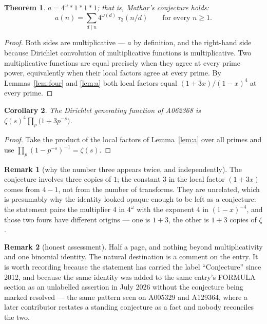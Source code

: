 \documentclass[11pt,a4paper]{article}
\theoremstyle{plain}
\newtheorem{theorem}{Theorem}
\newtheorem{corollary}[theorem]{Corollary}
\theoremstyle{definition}
\newtheorem*{remark}{Remark}
\begin{document}
\begin{theorem}\label{thm:main}
$a=4^{\omega}*1*1*1$; that is, Mathar's conjecture holds:
\[
  a(n)=\sum_{d\mid n}4^{\omega(d)}\,\tau_{3}(n/d)\qquad\text{for every }n\ge1.
\]
\end{theorem}

\begin{proof}
Both sides are multiplicative --- $a$ by definition, and the right-hand side because
Dirichlet convolution of multiplicative functions is multiplicative. Two multiplicative
functions are equal precisely when they agree at every prime power, equivalently when their
local factors agree at every prime. By Lemmas~\ref{lem:four} and \ref{lem:a} both local
factors equal $(1+3x)/(1-x)^{4}$ at every prime.
\end{proof}

\begin{corollary}
The Dirichlet generating function of A062368 is $\zeta(s)^{4}\prod_{p}\bigl(1+3p^{-s}\bigr)$.
\end{corollary}

\begin{proof}
Take the product of the local factors of Lemma~\ref{lem:a} over all primes and use
$\prod_{p}(1-p^{-s})^{-1}=\zeta(s)$.
\end{proof}

\begin{remark}[why the number three appears twice, and independently]
The conjecture involves three copies of $1$; the constant 3 in the local factor $(1+3x)$
comes from $4-1$, not from the number of transforms. They are unrelated, which is
presumably why the identity looked opaque enough to be left as a conjecture: the statement
pairs the multiplier 4 in $4^{\omega}$ with the exponent 4 in $(1-x)^{-4}$, and those two
fours have different origins --- one is $1+3$, the other is $1+3$ copies of $\zeta$.
\end{remark}

\begin{remark}[honest assessment]
Half a page, and nothing beyond multiplicativity and one binomial identity. The natural
destination is a comment on the entry. It is worth recording because the statement has
carried the label ``Conjecture'' since 2012, and because the same identity was added to the
same entry's FORMULA section as an unlabelled assertion in July 2026 without the conjecture
being marked resolved --- the same pattern seen on A005329 and A129364, where a later
contributor restates a standing conjecture as a fact and nobody reconciles the two.
\end{remark}
\end{document}
